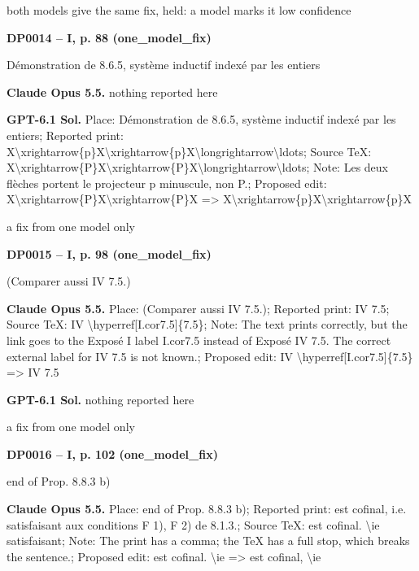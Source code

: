 both models give the same fix, held: a model marks it low confidence\par
\par\noindent\hypertarget{DP0014}{}\textbf{DP0014 -- I, p. 88 (one\_model\_fix)}\par
Démonstration de 8.6.5, système inductif indexé par les entiers\par
\textbf{Claude Opus 5.5.} nothing reported here\par
\textbf{GPT-6.1 Sol.} Place: Démonstration de 8.6.5, système inductif indexé par les entiers; Reported print: X\textbackslash{}xrightarrow\{p\}X\textbackslash{}xrightarrow\{p\}X\textbackslash{}longrightarrow\textbackslash{}ldots; Source TeX: X\textbackslash{}xrightarrow\{P\}X\textbackslash{}xrightarrow\{P\}X\textbackslash{}longrightarrow\textbackslash{}ldots; Note: Les deux flèches portent le projecteur p minuscule, non P.; Proposed edit: X\textbackslash{}xrightarrow\{P\}X\textbackslash{}xrightarrow\{P\}X =\allowbreak > X\textbackslash{}xrightarrow\{p\}X\textbackslash{}xrightarrow\{p\}X\par
a fix from one model only\par
\par\noindent\hypertarget{DP0015}{}\textbf{DP0015 -- I, p. 98 (one\_model\_fix)}\par
(Comparer aussi IV 7.5.)\par
\textbf{Claude Opus 5.5.} Place: (Comparer aussi IV 7.5.); Reported print: IV 7.5; Source TeX: IV \textbackslash{}hyperref[I.cor7.5]\{7.5\}; Note: The text prints correctly, but the link goes to the Exposé I label I.cor7.5 instead of Exposé IV 7.5. The correct external label for IV 7.5 is not known.; Proposed edit: IV \textbackslash{}hyperref[I.cor7.5]\{7.5\} =\allowbreak > IV 7.5\par
\textbf{GPT-6.1 Sol.} nothing reported here\par
a fix from one model only\par
\par\noindent\hypertarget{DP0016}{}\textbf{DP0016 -- I, p. 102 (one\_model\_fix)}\par
end of Prop. 8.8.3 b)\par
\textbf{Claude Opus 5.5.} Place: end of Prop. 8.8.3 b); Reported print: est cofinal, i.e. satisfaisant aux conditions F 1), F 2) de 8.1.3.; Source TeX: est cofinal. \textbackslash{}ie satisfaisant; Note: The print has a comma; the TeX has a full stop, which breaks the sentence.; Proposed edit: est cofinal. \textbackslash{}ie =\allowbreak > est cofinal, \textbackslash{}ie\par
